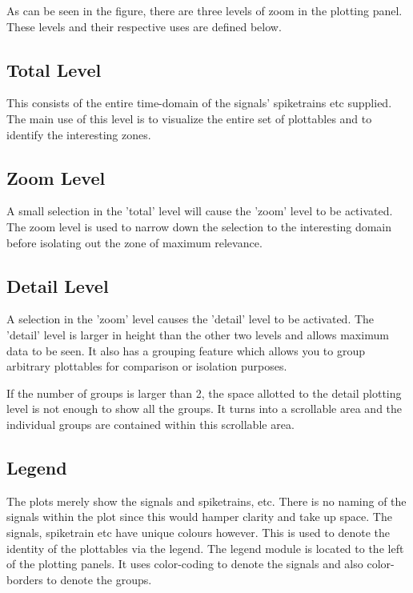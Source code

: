 As can be seen in the figure, there are three levels of zoom in the
plotting panel.  These levels and their respective uses are defined
below.

\subsection{Total Level}

This consists of the entire time-domain of the signals' spiketrains
etc supplied.  The main use of this level is to visualize the entire
set of plottables and to identify the interesting zones.

\subsection{Zoom Level}

A small selection in the 'total' level will cause the 'zoom' level to
be activated.  The zoom level is used to narrow down the selection to
the interesting domain before isolating out the zone of maximum
relevance.

\subsection{Detail Level}

A selection in the 'zoom' level causes the 'detail' level to be
activated.  The 'detail' level is larger in height than the other two
levels and allows maximum data to be seen.  It also has a grouping
feature which allows you to group arbitrary plottables for comparison
or isolation purposes.

If the number of groups is larger than 2, the space allotted to the
detail plotting level is not enough to show all the groups.  It turns
into a scrollable area and the individual groups are contained within
this scrollable area.

\subsection{Legend}

The plots merely show the signals and spiketrains, etc.  There is no
naming of the signals within the plot since this would hamper clarity
and take up space.  The signals, spiketrain etc have unique colours
however.  This is used to denote the identity of the plottables via
the legend.  The legend module is located to the left of the plotting
panels.  It uses color-coding to denote the signals and also
color-borders to denote the groups.
